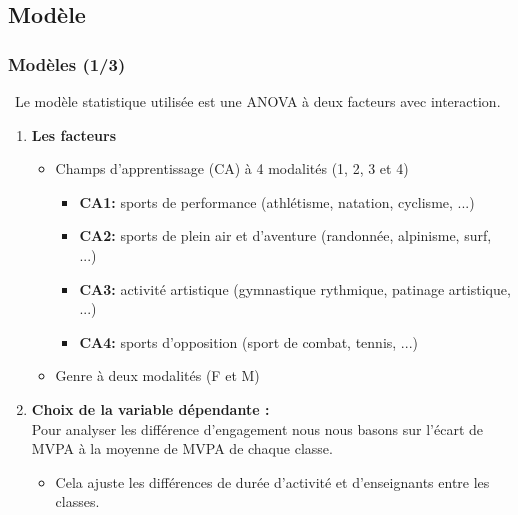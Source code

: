 \documentclass{beamer}
\begin{document}
	\subsection{Modèle}
		\begin{frame}
			\frametitle{Modèles (1/3)} 
			\textcolor{sectioncolor}{\faExclamationTriangle \, Le modèle statistique utilisée est une ANOVA à deux facteurs avec interaction.}
			\pause
			\begin{enumerate}
				\item \textbf{Les facteurs}
				\vfill
				\begin{itemize}
					\item Champs d'apprentissage (CA) à 4 modalités (1, 2, 3 et 4)
					\vfill
					\pause
					\begin{itemize}
						\item \textbf{CA1:} sports de performance (athlétisme, natation, cyclisme, ...)
						\vfill
						\item \textbf{CA2:} sports de plein air et d'aventure (randonnée, alpinisme, surf, ...)
						\vfill
						\item \textbf{CA3:} activité artistique (gymnastique rythmique, patinage artistique, ...)
						\vfill
						\item \textbf{CA4:} sports d'opposition (sport de combat, tennis, ...)
					\end{itemize}
					\pause
					\item Genre à deux modalités (F et M)
				\end{itemize}
				\pause
				\item \textbf{Choix de la variable dépendante :}\\
				Pour analyser les différence d'engagement nous nous basons sur l'écart de MVPA à la moyenne de MVPA de chaque classe.
				\pause
				\begin{itemize}
					\item Cela ajuste les différences de durée d'activité et d'enseignants entre les classes.
				\end{itemize}
				
			\end{enumerate}
		\end{frame}
		
\end{document}
